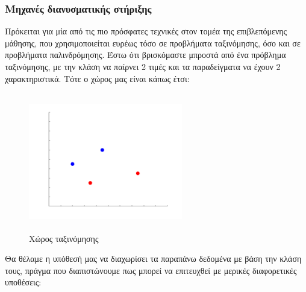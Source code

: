 \documentclass{article}
\begin{document}
\subsubsection{Μηχανές διανυσματικής στήριξης}
Πρόκειται για μία από τις πιο πρόσφατες τεχνικές στον τομέα της επιβλεπόμενης μάθησης, που χρησιμοποιείται ευρέως τόσο σε προβλήματα ταξινόμησης, όσο και σε προβλήματα παλινδρόμησης.
Έστω ότι βρισκόμαστε μπροστά από ένα πρόβλημα ταξινόμησης, με την κλάση να παίρνει 2 τιμές και τα παραδείγματα να έχουν 2 χαρακτηριστικά. Τότε ο χώρος μας είναι κάπως έτσι:
\begin{figure}[H]
	\centering			
    \includegraphics[width=0.6\textwidth, height=6cm]{svm_dots.png}
    \caption[Χώρος ταξινόμησης μηχανής διανυσματικής στήριξης]{Χώρος ταξινόμησης}
 \end{figure}
 Θα θέλαμε η υπόθεσή μας να διαχωρίσει τα παραπάνω δεδομένα με βάση την κλάση τους, πράγμα που διαπιστώνουμε πως μπορεί να επιτευχθεί με μερικές διαφορετικές υποθέσεις:
\end{document}
